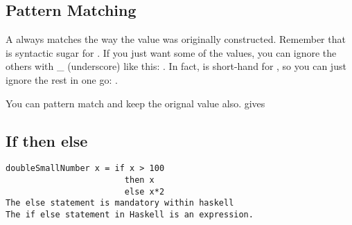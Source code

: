 \subsection{Pattern Matching}
A  always matches the way the value was originally constructed. Remember that  is syntactic sugar for .
If you just want some of the values, you can ignore the others with \_ (underscore) like this:
. 
In fact,  is short-hand for , so you can just ignore the rest in one go:
.

You can pattern match and keep the orignal value also.
gives 

\subsection{If then else}
\begin{lstlisting}
doubleSmallNumber x = if x > 100  
                        then x  
                        else x*2   
The else statement is mandatory within haskell
The if else statement in Haskell is an expression.
\end{lstlisting}

